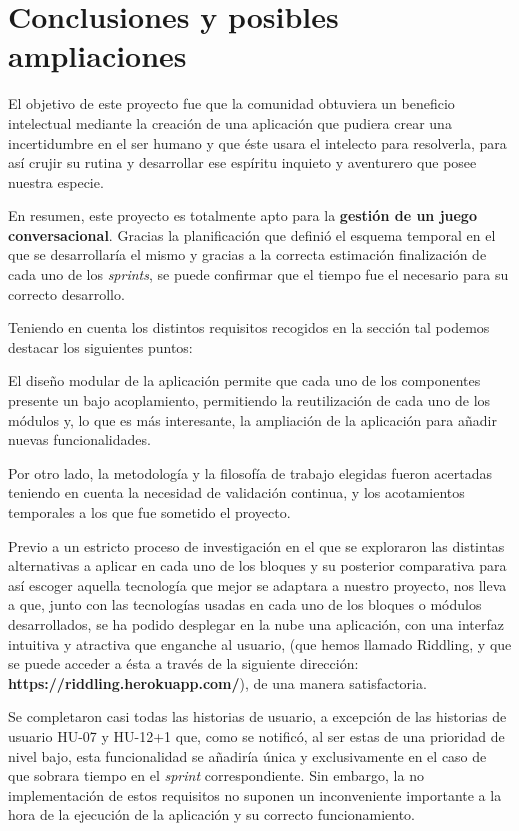 \chapter{Conclusiones y posibles ampliaciones}

El objetivo de este proyecto fue que la comunidad obtuviera un beneficio intelectual mediante la creación de una aplicación que pudiera crear una incertidumbre en el ser humano y que éste usara el intelecto para resolverla, para así crujir su rutina y desarrollar ese espíritu inquieto y aventurero que posee nuestra especie.

En resumen, este proyecto es totalmente apto para la \textbf{gestión de un juego conversacional}. Gracias la planificación que definió el esquema temporal en el que se desarrollaría el mismo y gracias a la correcta estimación finalización de cada uno de los \textit{sprints}, se puede confirmar que el tiempo fue el necesario para su correcto desarrollo.

Teniendo en cuenta los distintos requisitos recogidos en la sección tal podemos destacar los siguientes puntos:

El diseño modular de la aplicación permite que cada uno de los componentes presente un bajo acoplamiento, permitiendo la reutilización de cada uno de los módulos y, lo que es más interesante, la ampliación de la aplicación para añadir nuevas funcionalidades. 

Por otro lado, la metodología y la filosofía de trabajo elegidas fueron acertadas teniendo en cuenta la necesidad de validación continua, y los acotamientos temporales a los que fue sometido el proyecto.

Previo a un estricto proceso de investigación en el que se exploraron las distintas alternativas a aplicar en cada uno de los bloques y su posterior comparativa para así escoger aquella tecnología que mejor se adaptara a nuestro proyecto, nos lleva a que, junto con las tecnologías usadas en cada uno de los bloques o módulos desarrollados, se ha podido desplegar en la nube una aplicación, con una interfaz intuitiva y atractiva que enganche al usuario, (que hemos llamado Riddling, y que se puede acceder a ésta a través de la siguiente dirección: \textbf{https://riddling.herokuapp.com/}), de una manera satisfactoria.

Se completaron casi todas las historias de usuario, a excepción de las historias de usuario HU-07 y HU-12+1 que, como se notificó, al ser estas de una prioridad de nivel bajo, esta funcionalidad se añadiría única y exclusivamente en el caso de que sobrara tiempo en el \textit{sprint} correspondiente. Sin embargo, la no implementación de estos requisitos no suponen un inconveniente importante a la hora de la ejecución de la aplicación y su correcto funcionamiento. 

